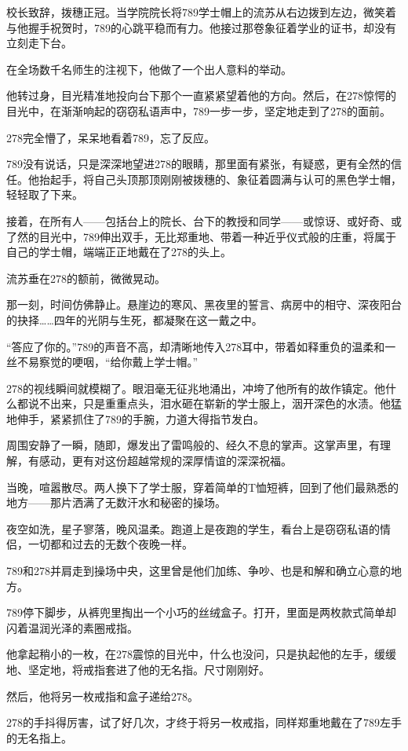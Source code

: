 \documentclass[a4paper]{book}
\begin{document}
校长致辞，拨穗正冠。当学院院长将789学士帽上的流苏从右边拨到左边，微笑着与他握手祝贺时，789的心跳平稳而有力。他接过那卷象征着学业的证书，却没有立刻走下台。

在全场数千名师生的注视下，他做了一个出人意料的举动。

他转过身，目光精准地投向台下那个一直紧紧望着他的方向。然后，在278惊愕的目光中，在渐渐响起的窃窃私语声中，789一步一步，坚定地走到了278的面前。

278完全懵了，呆呆地看着789，忘了反应。

789没有说话，只是深深地望进278的眼睛，那里面有紧张，有疑惑，更有全然的信任。他抬起手，将自己头顶那顶刚刚被拨穗的、象征着圆满与认可的黑色学士帽，轻轻取了下来。

接着，在所有人——包括台上的院长、台下的教授和同学——或惊讶、或好奇、或了然的目光中，789伸出双手，无比郑重地、带着一种近乎仪式般的庄重，将属于自己的学士帽，端端正正地戴在了278的头上。

流苏垂在278的额前，微微晃动。

那一刻，时间仿佛静止。悬崖边的寒风、黑夜里的誓言、病房中的相守、深夜阳台的抉择……四年的光阴与生死，都凝聚在这一戴之中。

“答应了你的。”789的声音不高，却清晰地传入278耳中，带着如释重负的温柔和一丝不易察觉的哽咽，“给你戴上学士帽。”

278的视线瞬间就模糊了。眼泪毫无征兆地涌出，冲垮了他所有的故作镇定。他什么都说不出来，只是重重点头，泪水砸在崭新的学士服上，洇开深色的水渍。他猛地伸手，紧紧抓住了789的手腕，力道大得指节发白。

周围安静了一瞬，随即，爆发出了雷鸣般的、经久不息的掌声。这掌声里，有理解，有感动，更有对这份超越常规的深厚情谊的深深祝福。

当晚，喧嚣散尽。两人换下了学士服，穿着简单的T恤短裤，回到了他们最熟悉的地方——那片洒满了无数汗水和秘密的操场。

夜空如洗，星子寥落，晚风温柔。跑道上是夜跑的学生，看台上是窃窃私语的情侣，一切都和过去的无数个夜晚一样。

789和278并肩走到操场中央，这里曾是他们加练、争吵、也是和解和确立心意的地方。

789停下脚步，从裤兜里掏出一个小巧的丝绒盒子。打开，里面是两枚款式简单却闪着温润光泽的素圈戒指。

他拿起稍小的一枚，在278震惊的目光中，什么也没问，只是执起他的左手，缓缓地、坚定地，将戒指套进了他的无名指。尺寸刚刚好。

然后，他将另一枚戒指和盒子递给278。

278的手抖得厉害，试了好几次，才终于将另一枚戒指，同样郑重地戴在了789左手的无名指上。
\end{document}
